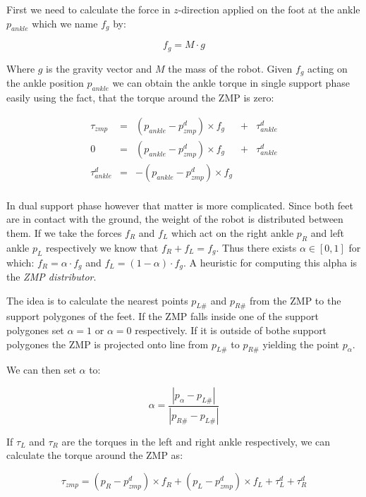 \documentclass[english,ngerman]{KITreprt}
\begin{document}
First we need to calculate the force in $z$-direction applied on the
foot at the ankle $p_{ankle}$ which we name $f_g$ by:

\begin{equation}
f_g = M \cdot g
\end{equation}

Where $g$ is the gravity vector and $M$ the mass of the robot. Given
$f_g$ acting on the ankle position $p_{ankle}$ we can obtain the ankle
torque in single support phase easily using the fact, that the torque
around the ZMP is zero:

\begin{equation}
\begin{array}{lcccr}
\tau_{zmp} & = & (p_{ankle} - p^d_{zmp}) \times f_g & + & \tau^d_{ankle} \\
0 & = & (p_{ankle} - p^d_{zmp}) \times f_g & + & \tau^d_{ankle} \\
\tau^d_{ankle} & = & -(p_{ankle} - p^d_{zmp}) \times f_g & & \\
\end{array}
\end{equation}

In dual support phase however that matter is more complicated. Since
both feet are in contact with the ground, the weight of the robot is
distributed between them. If we take the forces $f_R$ and $f_L$ which
act on the right ankle $p_R$ and left ankle $p_L$ respectively we know
that $f_R + f_L = f_g$. Thus there exists $\alpha \in [0, 1]$ for which:
$f_R = \alpha \cdot f_g$ and $f_L = (1-\alpha) \cdot f_g$. A heuristic
for computing this alpha is the \emph{ZMP distributor}.

The idea is to calculate the nearest points $p_{L\#}$ and $p_{R\#}$ from
the ZMP to the support polygones of the feet. If the ZMP falls inside
one of the support polygones set $\alpha = 1$ or $\alpha = 0$
respectively. If it is outside of bothe support polygones the ZMP is
projected onto line from $p_{L\#}$ to $p_{R\#}$ yielding the point
$p_{\alpha}$.

We can then set $\alpha$ to:

\begin{equation}
\alpha = \frac{|p_{\alpha} - p_{L\#}|}{|p_{R\#} - p_{L\#}|}
\end{equation}

If $\tau_L$ and $\tau_R$ are the torques in the left and right ankle
respectively, we can calculate the torque around the ZMP as:

\begin{equation} \label{eq:ds-torque}
\tau_{zmp} = (p_R - p^d_{zmp}) \times f_R + (p_L - p^d_{zmp}) \times f_L + \tau^d_L + \tau^d_R
\end{equation}
\end{document}
